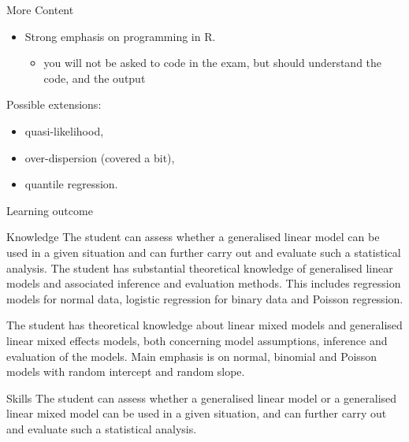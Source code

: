 \documentclass[
  ignorenonframetext,
]{beamer}
\providecommand{\tightlist}{%
  \setlength{\itemsep}{0pt}\setlength{\parskip}{0pt}}
\begin{document}
\begin{frame}
\begin{block}{More Content}
\protect\hypertarget{more-content}{}
\begin{itemize}
\tightlist
\item
  Strong emphasis on programming in R.

  \begin{itemize}
  \tightlist
  \item
    you will not be asked to code in the exam, but should understand the
    code, and the output
  \end{itemize}
\end{itemize}

Possible extensions:

\begin{itemize}
\tightlist
\item
  quasi-likelihood,
\item
  over-dispersion (covered a bit),
\item
  quantile regression.
\end{itemize}
\end{block}
\end{frame}

\begin{frame}
\begin{block}{Learning outcome}
\protect\hypertarget{learning-outcome}{}
\begin{block}{Knowledge}
\protect\hypertarget{knowledge}{}
The student can assess whether a generalised linear model can be used in
a given situation and can further carry out and evaluate such a
statistical analysis. The student has substantial theoretical knowledge
of generalised linear models and associated inference and evaluation
methods. This includes regression models for normal data, logistic
regression for binary data and Poisson regression.

The student has theoretical knowledge about linear mixed models and
generalised linear mixed effects models, both concerning model
assumptions, inference and evaluation of the models. Main emphasis is on
normal, binomial and Poisson models with random intercept and random
slope.
\end{block}
\end{block}
\end{frame}

\begin{frame}
\begin{block}{Skills}
\protect\hypertarget{skills}{}
The student can assess whether a generalised linear model or a
generalised linear mixed model can be used in a given situation, and can
further carry out and evaluate such a statistical analysis.
\end{block}
\end{frame}
\end{document}
